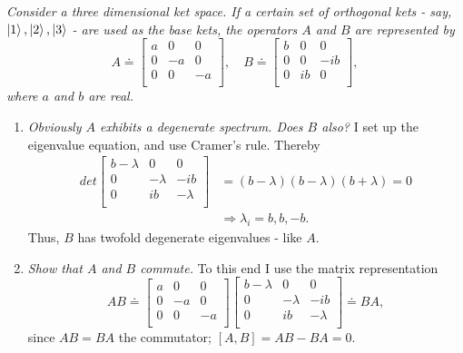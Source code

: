\begin{example}
	\emph{Consider a three dimensional ket space. If a certain set of orthogonal kets - say, $\ket{1}, \ket{2}, \ket{3}$ - are used as the base kets, the operators $A$ and $B$ are represented by}
	\begin{equation}
		A\doteq
		\begin{bmatrix}
			a & 0 & 0 \\
			0 & -a & 0\\
			0 & 0 & -a \\
		\end{bmatrix}, \quad B\doteq\begin{bmatrix}
			b & 0 & 0 \\
			0 & 0 & -ib\\
			0 & ib & 0 \\
		\end{bmatrix},
	\end{equation} 
	\emph{where $a$ and $b$ are real. }
	\begin{enumerate}
		\item \emph{Obviously $A$ exhibits a degenerate spectrum. Does $B$ also?}\newline
		I set up the eigenvalue equation, and use Cramer's rule. Thereby 
		\begin{equation}
			\begin{split}
				det\begin{bmatrix}
					b-\lambda & 0 & 0 \\
					0 & -\lambda & -ib\\
					0 & ib & -\lambda \\
				\end{bmatrix}
				&=(b-\lambda)(b-\lambda)(b+\lambda)=0\\
				&\Rightarrow \lambda_i=b,b,-b.
			\end{split}
		\end{equation} 
		Thus, $B$ has twofold degenerate eigenvalues - like $A$. \newline
		
		\item \emph{Show that $A$ and $B$ commute.}\newline
		To this end I use the matrix representation
		\begin{equation}
			AB\doteq
			\begin{bmatrix}
				a & 0 & 0 \\
				0 & -a & 0\\
				0 & 0 & -a \\
			\end{bmatrix}\begin{bmatrix}
				b-\lambda & 0 & 0 \\
				0 & -\lambda & -ib\\
				0 & ib & -\lambda \\
			\end{bmatrix}\doteq BA,
		\end{equation} 
		since $AB=BA$ the commutator; $[A,B]=AB-BA=0$. \newline
		

\end{enumerate}
\end{example}
